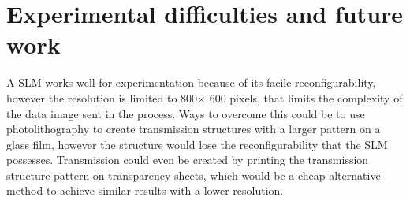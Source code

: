\section{Experimental difficulties and future work}
A SLM works well for experimentation because of its facile reconfigurability, however the resolution is limited to 800$\times$ 600 pixels, that limits the complexity of the data image sent in the process. Ways to overcome this could be to use photolithography to create transmission structures with a larger pattern on a glass film, however the structure would lose the reconfigurability that the SLM possesses. Transmission could even be created by printing the transmission structure pattern on transparency sheets, which would be a cheap alternative method to achieve similar results with a lower resolution.
